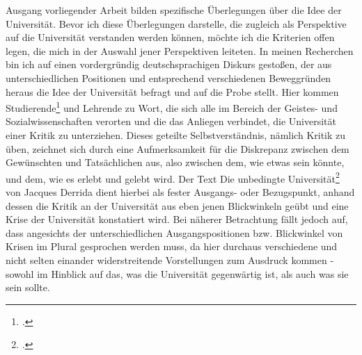 Ausgang vorliegender Arbeit bilden spezifische Überlegungen über die Idee der
Universität. Bevor ich diese Überlegungen darstelle, die zugleich als
Perspektive auf die Universität verstanden werden können, möchte ich die
Kriterien offen legen, die mich in der Auswahl jener Perspektiven leiteten. In
meinen Recherchen bin ich auf einen vordergründig deutschsprachigen Diskurs
gestoßen, der aus unterschiedlichen Positionen und entsprechend verschiedenen
Beweggründen heraus die Idee der Universität befragt und auf die Probe stellt.
Hier kommen Studierende\footnotemark \footcitetext{lohman} und Lehrende
\footnotemark {} zu Wort, die sich alle im Bereich der Geistes- und
  Sozialwissenschaften verorten und die das Anliegen verbindet, die Universität
  einer Kritik zu unterziehen. Dieses geteilte Selbstverständnis, nämlich
  Kritik zu üben, zeichnet sich durch eine Aufmerksamkeit für die Diskrepanz
  zwischen dem Gewünschten und Tatsächlichen aus, also zwischen dem, wie etwas
  sein könnte, und dem, wie es erlebt und gelebt wird.\footnotemark
   Der Text \glqq Die
  unbedingte Universität\grqq \footnotemark \footcitetext{derrida} von Jacques Derrida dient hierbei als fester
  Ausgangs- oder Bezugspunkt, anhand dessen die Kritik an der Universität aus
  eben jenen Blickwinkeln geübt und eine Krise der Universität konstatiert
  wird.  Bei näherer Betrachtung fällt jedoch auf, dass angesichts der
  unterschiedlichen Ausgangspositionen bzw. Blickwinkel von Krisen im Plural
  gesprochen werden muss, da hier durchaus verschiedene und nicht selten
  einander widerstreitende Vorstellungen zum Ausdruck kommen - sowohl im
  Hinblick auf das, was die Universität gegenwärtig ist, als auch was sie sein
  sollte. 


